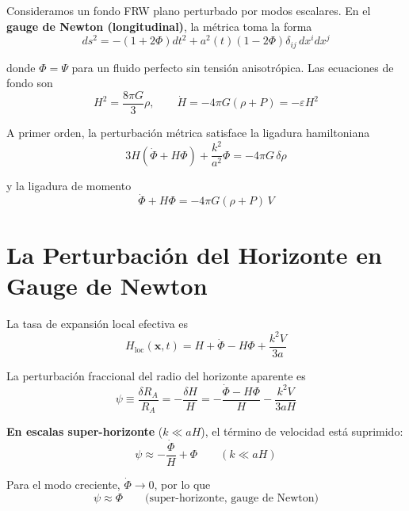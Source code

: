 \documentclass[12pt,a4paper]{article}
\begin{document}
Consideramos un fondo FRW plano perturbado por modos escalares. En el \textbf{gauge de Newton (longitudinal)}, la métrica toma la forma
\begin{equation}
ds^2 = -(1 + 2\Phi)dt^2 + a^2(t)(1 - 2\Phi)\delta_{ij}\,dx^i dx^j \tag{2}
\end{equation}

donde $\Phi = \Psi$ para un fluido perfecto sin tensión anisotrópica. Las ecuaciones de fondo son
\begin{equation}
H^2 = \frac{8\pi G}{3}\rho, \qquad \dot{H} = -4\pi G(\rho + P) = -\varepsilon H^2 \tag{3}
\end{equation}

A primer orden, la perturbación métrica satisface la ligadura hamiltoniana
\begin{equation}
3H(\dot{\Phi} + H\Phi) + \frac{k^2}{a^2}\Phi = -4\pi G\,\delta\rho \tag{4}
\end{equation}

y la ligadura de momento
\begin{equation}
\dot{\Phi} + H\Phi = -4\pi G(\rho + P)\,V \tag{5}
\end{equation}

\section{La Perturbación del Horizonte en Gauge de Newton}

La tasa de expansión local efectiva es
\begin{equation}
H_\text{loc}(\mathbf{x}, t) = H + \dot{\Phi} - H\Phi + \frac{k^2 V}{3a} \tag{6}
\end{equation}

La perturbación fraccional del radio del horizonte aparente es
\begin{equation}
\psi \equiv \frac{\delta R_A}{R_A} = -\frac{\delta H}{H} = -\frac{\dot{\Phi} - H\Phi}{H} - \frac{k^2 V}{3aH} \tag{7}
\end{equation}

\textbf{En escalas super-horizonte} ($k \ll aH$), el término de velocidad está suprimido:
\begin{equation}
\psi \approx -\frac{\dot{\Phi}}{H} + \Phi \qquad (k \ll aH) \tag{8}
\end{equation}

Para el modo creciente, $\dot{\Phi} \to 0$, por lo que
\begin{equation}
\psi \approx \Phi \qquad \text{(super-horizonte, gauge de Newton)} \tag{9}
\end{equation}
\end{document}

